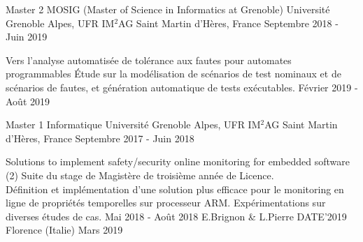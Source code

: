 


\begin{cventries}



\cventry
{Master 2 MOSIG (Master of Science in Informatics at Grenoble)} %
{Université Grenoble Alpes, UFR IM$^2$AG} %
{Saint Martin d'Hères, France} %
{Septembre 2018 - Juin 2019} %
{}

%
{}%
{}%
{}%
{
  \begin{cvdescription}
    {Vers l'analyse automatisée de tolérance aux fautes pour automates
      programmables}%
    {Étude sur la modélisation de scénarios de test nominaux et de
      scénarios de fautes, et génération automatique de tests
      exécutables.}%
    {Février 2019 - Août 2019}
  \end{cvdescription}
}

\vspace{-.5cm}


\cventry
{Master 1 Informatique} %
{Université Grenoble Alpes, UFR IM$^2$AG} %
{Saint Martin d'Hères, France} %
{Septembre 2017 - Juin 2018} %
{}

%
{}%
{}%
{}%
{
  \begin{cvdescription}
    {Solutions to implement safety/security online monitoring for
      embedded software (2)}%
    {Suite du stage de Magistère de troisième année de Licence.\\
      Définition et implémentation d'une solution plus efficace pour
      le monitoring en ligne de propriétés temporelles sur processeur
      ARM. Expérimentations sur diverses études de cas.}%
    {Mai 2018 - Août 2018} %
    {E.Brignon \& L.Pierre}%
    {DATE'2019}%
    {Florence (Italie)}%
    {Mars 2019}
  \end{cvdescription}
}


\end{cventries}
